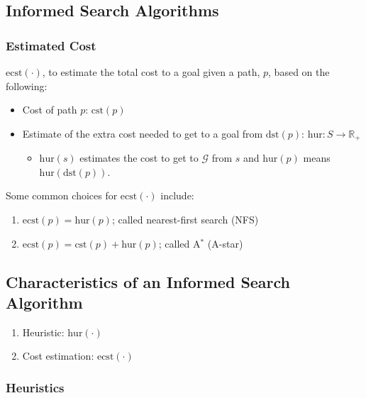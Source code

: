 \subsection{Informed Search Algorithms}
\subsubsection{Estimated Cost}
\begin{definition}
    $\text{ecst}(\cdot)$, to estimate the total cost to a goal given a path, $p$, based on the following:
    \begin{itemize}
        \item Cost of path $p$: $\text{cst}(p)$
        \item Estimate of the extra cost needed to get to a goal from $\text{dst}(p)$: $\text{hur} : S \to \mathbb{R}_+$
        \begin{itemize}
            \item $\text{hur}(s)$ estimates the cost to get to $\mathcal{G}$ from $s$ and $\text{hur}(p)$ means $\text{hur}(\text{dst}(p))$.
        \end{itemize}
    \end{itemize}
\end{definition}

\begin{example}
    Some common choices for $\text{ecst}(\cdot)$ include:
    \begin{enumerate}
        \item $\text{ecst}(p) = \text{hur}(p)$; called nearest-first search (NFS)
        \item $\text{ecst}(p) = \text{cst}(p) + \text{hur}(p)$; called A$^*$ (A-star)
    \end{enumerate}
\end{example}

\subsection{Characteristics of an Informed Search Algorithm}
\begin{definition}
    \begin{enumerate}
        \item Heuristic: $\text{hur}(\cdot)$
        \item Cost estimation: $\text{ecst}(\cdot)$
    \end{enumerate}
\end{definition}
\subsubsection{Heuristics}


